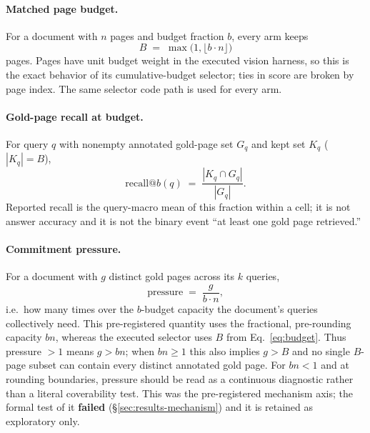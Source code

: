 \documentclass[11pt,letterpaper]{article}
\begin{document}
\paragraph{Matched page budget.} For a document with $n$ pages and budget fraction $b$, every arm
keeps
\begin{equation}
B \;=\; \max\!\bigl(1, \lfloor b \cdot n \rfloor\bigr)
\label{eq:budget}
\end{equation}
pages. Pages have unit budget weight in the executed vision harness, so this is the exact behavior
of its cumulative-budget selector; ties in score are broken by page index. The same selector code
path is used for every arm.

\paragraph{Gold-page recall at budget.} For query $q$ with nonempty annotated gold-page set $G_q$
and kept set $K_q$ ($|K_q| = B$),
\begin{equation}
\mathrm{recall}@b(q) \;=\; \frac{|K_q \cap G_q|}{|G_q|}.
\label{eq:recall}
\end{equation}
Reported recall is the query-macro mean of this fraction within a cell; it is not answer accuracy
and it is not the binary event ``at least one gold page retrieved.''

\paragraph{Commitment pressure.} For a document with $g$ distinct gold pages across its $k$
queries,
\begin{equation}
\mathrm{pressure} \;=\; \frac{g}{b \cdot n},
\label{eq:pressure}
\end{equation}
i.e.\ how many times over the $b$-budget capacity the document's queries collectively need.
This pre-registered quantity uses the fractional, pre-rounding capacity $bn$, whereas the executed
selector uses $B$ from Eq.~\eqref{eq:budget}. Thus pressure $>1$ means $g>bn$; when $bn\geq1$ this
also implies $g>B$ and no single $B$-page subset can contain every distinct annotated gold page.
For $bn<1$ and at rounding boundaries, pressure should be read as a continuous diagnostic rather
than a literal coverability test.
This was the pre-registered mechanism axis; the formal test of it \textbf{failed}
(\S\ref{sec:results-mechanism}) and it is retained as exploratory only.
\end{document}
